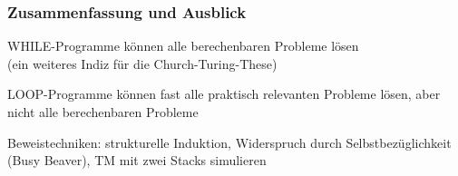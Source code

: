 \documentclass[aspectratio=1610,onlymath]{beamer}
\begin{document}
\begin{frame}\frametitle{Zusammenfassung und Ausblick}

WHILE-Programme können alle berechenbaren Probleme lösen\\
(ein weiteres Indiz für die Church-Turing-These)
\bigskip

LOOP-Programme können fast alle praktisch relevanten Probleme lösen,
aber nicht alle berechenbaren Probleme
\bigskip

Beweistechniken: strukturelle Induktion, Widerspruch durch Selbstbezüglichkeit (Busy Beaver), TM mit zwei Stacks simulieren\bigskip



\end{frame}

% 
% 
\end{document}
